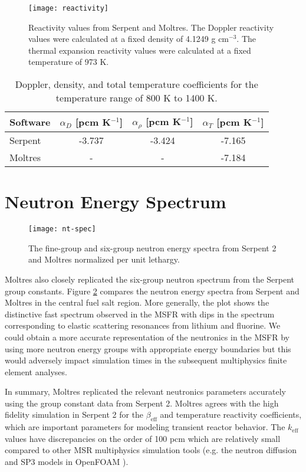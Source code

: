 \begin{figure}[htb!]
    \centering
    \texttt{[image: reactivity]}
    \caption{Reactivity values from Serpent and Moltres. The Doppler
    reactivity values were calculated at a fixed density of 4.1249 g
    cm$^{-3}$. The thermal expansion reactivity values were calculated at a
    fixed temperature of 973 K.}
    \label{fig:reactivity}
\end{figure}
%
\begin{table}[htb!]
	\centering
	\caption{Doppler, density, and total temperature coefficients
	for the temperature range of 800 K to 1400 K.}
	\begin{tabular}{l S S S}
		\toprule
		{Software} & {$\alpha_D$ [pcm
		K$^{-1}$]} & {$\alpha_\rho$ [pcm K$^{-1}$]} & {$\alpha_T$ [pcm
		K$^{-1}$]} \\
		\midrule
		{Serpent} & -3.737  & -3.424  &
		-7.165  \\
		{Moltres} & {-} & {-} & -7.184\\
		\bottomrule
	\end{tabular}
	\label{table:alpha}
\end{table}

\section{Neutron Energy Spectrum}

\begin{figure}[htb!]
    \centering
    \texttt{[image: nt-spec]}
    \caption{The fine-group and six-group neutron energy spectra from Serpent
    2 and Moltres normalized per unit lethargy.}
    \label{fig:ntspec}
\end{figure}

Moltres also closely replicated the six-group neutron spectrum from the
Serpent group constants. Figure \ref{fig:ntspec} compares the neutron energy
spectra from Serpent and Moltres in the central fuel salt region. More
generally, the
plot shows the distinctive fast spectrum observed in the \gls{MSFR} with dips
in the spectrum corresponding to elastic scattering resonances from lithium
and fluorine. We could obtain a more accurate representation of the neutronics
in the \gls{MSFR} by using more neutron energy groups with appropriate energy
boundaries but this would adversely impact simulation times in the
subsequent multiphysics finite element analyses.

In summary, Moltres replicated the relevant neutronics parameters
accurately using the group constant data from Serpent 2. Moltres agrees with
the high fidelity simulation in Serpent 2 for the $\beta_{\text{eff}}$ and
temperature reactivity coefficients, which are important parameters for
modeling transient reactor behavior. The $k_{\text{eff}}$ values have
discrepancies on the order of 100 pcm which are relatively small compared
to other \gls{MSR} multiphysics simulation tools (e.g. the neutron diffusion
and SP3 models in OpenFOAM \cite{cervi_development_2019}).
